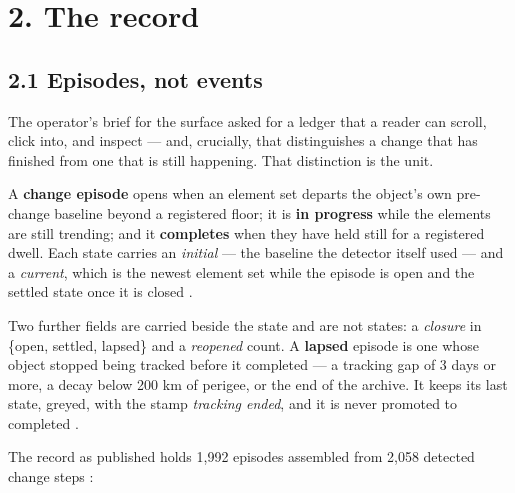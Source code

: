 \documentclass[11pt]{article}
\begin{document}
\section*{2. The record}

\subsection*{2.1 Episodes, not events}

The operator's brief for the surface asked for a ledger that a reader can scroll, click into, and inspect --- and, crucially, that distinguishes a change that has finished from one that is still happening. That distinction is the unit.

A \textbf{change episode} opens when an element set departs the object's own pre-change baseline beyond a registered floor; it is \textbf{in progress} while the elements are still trending; and it \textbf{completes} when they have held still for a registered dwell. Each state carries an \emph{initial} --- the baseline the detector itself used --- and a \emph{current}, which is the newest element set while the episode is open and the settled state once it is closed%
.

Two further fields are carried beside the state and are not states: a \emph{closure} in \{open, settled, lapsed\} and a \emph{reopened} count. A \textbf{lapsed} episode is one whose object stopped being tracked before it completed --- a tracking gap of 3 days or more, a decay below 200 km of perigee, or the end of the archive. It keeps its last state, greyed, with the stamp \emph{tracking ended}, and it is never promoted to completed%
.

The record as published holds 1,992 episodes assembled from 2,058 detected change steps%
:
\end{document}
